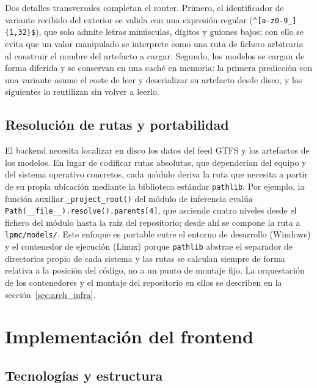 Dos detalles transversales completan el router. Primero, el identificador de variante recibido del exterior se valida con una expresión regular (\texttt{\textasciicircum[a-z0-9\_]\{1,32\}\$}), que solo admite letras minúsculas, dígitos y guiones bajos; con ello se evita que un valor manipulado se interprete como una ruta de fichero arbitraria al construir el nombre del artefacto a cargar. Segundo, los modelos se cargan de forma diferida y se conservan en una caché en memoria: la primera predicción con una variante asume el coste de leer y deserializar su artefacto desde disco, y las siguientes lo reutilizan sin volver a leerlo.

\subsection{Resolución de rutas y portabilidad}
\label{subsec:impl_backend_docker}

El backend necesita localizar en disco los datos del feed GTFS y los artefactos de los modelos. En lugar de codificar rutas absolutas, que dependerían del equipo y del sistema operativo concretos, cada módulo deriva la ruta que necesita a partir de su propia ubicación mediante la biblioteca estándar \texttt{pathlib}. Por ejemplo, la función auxiliar \texttt{\_project\_root()} del módulo de inferencia evalúa \texttt{Path(\_\_file\_\_).resolve().parents[4]}, que asciende cuatro niveles desde el fichero del módulo hasta la raíz del repositorio; desde ahí se compone la ruta a \texttt{lpmc/models/}. Este enfoque es portable entre el entorno de desarrollo (Windows) y el contenedor de ejecución (Linux) porque \texttt{pathlib} abstrae el separador de directorios propio de cada sistema y las rutas se calculan siempre de forma relativa a la posición del código, no a un punto de montaje fijo. La orquestación de los contenedores y el montaje del repositorio en ellos se describen en la sección~\ref{sec:arch_infra}.


\section{Implementación del frontend}
\label{sec:impl_frontend}

\subsection{Tecnologías y estructura}
\label{subsec:impl_frontend_tech}

